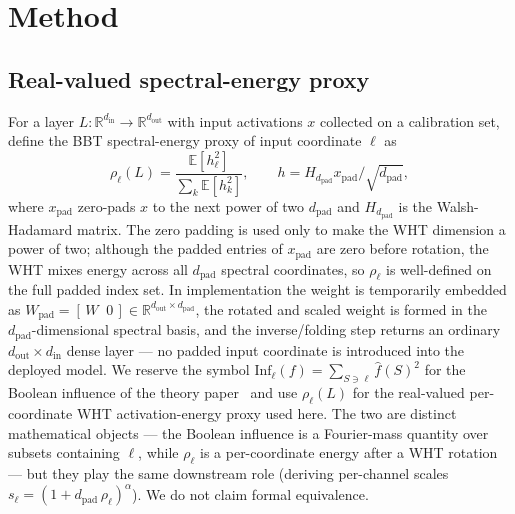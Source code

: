 \documentclass[11pt]{article}
\newcommand{\R}{\mathbb{R}}
\newcommand{\E}{\mathbb{E}}
\newcommand{\Inf}{\mathrm{Inf}}
\begin{document}
\section{Method}

\subsection{Real-valued spectral-energy proxy}
\label{sec:real_influence}

For a layer $L: \R^{d_{\text{in}}} \to \R^{d_{\text{out}}}$ with input activations $x$ collected on a calibration set, define the BBT spectral-energy proxy of input coordinate $\ell$ as
\begin{equation}
\label{eq:real_influence}
    \rho_\ell(L) = \frac{\E[h_\ell^2]}{\sum_k \E[h_k^2]}, \qquad h = H_{d_{\text{pad}}} x_{\text{pad}} / \sqrt{d_{\text{pad}}},
\end{equation}
where $x_{\text{pad}}$ zero-pads $x$ to the next power of two $d_{\text{pad}}$ and $H_{d_{\text{pad}}}$ is the Walsh-Hadamard matrix. The zero padding is used only to make the WHT dimension a power of two; although the padded entries of $x_{\text{pad}}$ are zero before rotation, the WHT mixes energy across all $d_{\text{pad}}$ spectral coordinates, so $\rho_\ell$ is well-defined on the full padded index set. In implementation the weight is temporarily embedded as $W_{\text{pad}} = [\,W \;\; 0\,] \in \R^{d_{\text{out}}\times d_{\text{pad}}}$, the rotated and scaled weight is formed in the $d_{\text{pad}}$-dimensional spectral basis, and the inverse/folding step returns an ordinary $d_{\text{out}}\times d_{\text{in}}$ dense layer --- no padded input coordinate is introduced into the deployed model. We reserve the symbol $\Inf_\ell(f) = \sum_{S \ni \ell} \hat{f}(S)^2$ for the Boolean influence of the theory paper~\cite{bbtTheoryCompanion} and use $\rho_\ell(L)$ for the real-valued per-coordinate WHT activation-energy proxy used here. The two are distinct mathematical objects --- the Boolean influence is a Fourier-mass quantity over subsets containing $\ell$, while $\rho_\ell$ is a per-coordinate energy after a WHT rotation --- but they play the same downstream role (deriving per-channel scales $s_\ell = (1+d_{\text{pad}}\, \rho_\ell)^\alpha$). We do not claim formal equivalence.
\end{document}
